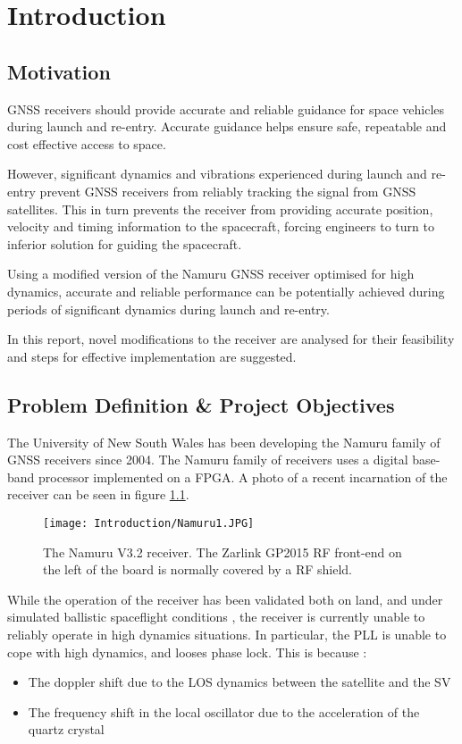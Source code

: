 \chapter{Introduction}\label{ch:intro}

\section{Motivation}
\ac{GNSS} receivers should provide accurate and reliable guidance for space vehicles during launch and re-entry. Accurate guidance helps ensure safe, repeatable and cost effective access to space.

However, significant dynamics and vibrations experienced during launch and re-entry prevent \ac{GNSS} receivers from reliably tracking the signal from \ac{GNSS} satellites. This in turn prevents the receiver from providing accurate position, velocity and timing information to the spacecraft, forcing engineers to turn to inferior solution for guiding the spacecraft.

Using a modified version of the Namuru \ac{GNSS} receiver optimised for high dynamics, accurate and reliable performance can be potentially achieved during periods of significant dynamics during launch and re-entry. 

In this report, novel modifications to the receiver are analysed for their feasibility and steps for effective implementation are suggested.

\section{Problem Definition \& Project Objectives}

The University of New South Wales has been developing the Namuru family of \ac{GNSS} receivers since 2004\cite{MumfordNamuru}. The Namuru family of receivers uses a digital base-band processor implemented on a \ac{FPGA}\cite{Glennon11aquariusfirmware}. A photo of a recent incarnation of the receiver can be seen in figure \ref{fig:Namuru1}.

\begin{figure}[!htb] 
    \centering
    \texttt{[image: Introduction/Namuru1.JPG]} 
    \caption{The Namuru V3.2 receiver. The Zarlink GP2015 \ac{RF} front-end on the left of the board is normally covered by a \ac{RF} shield.}
    \label{fig:Namuru1}
\end{figure}

While the operation of the receiver has been validated both on land, and under simulated ballistic spaceflight conditions \cite{NamuruSpaceflight1,NamuruSpaceflight2}, the receiver is currently unable to reliably operate in high dynamics situations. 
In particular, the \ac{PLL} is unable to cope with high dynamics, and looses phase lock. This is because : 
\begin{itemize}
\item{The doppler shift due to the \ac{LOS} dynamics between the satellite and the \ac{SV}}
\item{The frequency shift in the local oscillator due to the acceleration of the quartz crystal}
\end{itemize}

